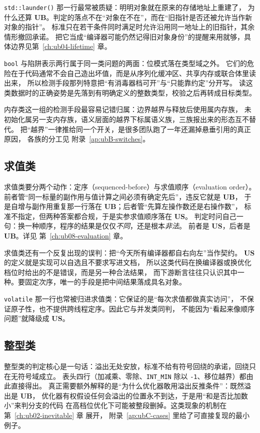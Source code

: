 \documentclass[12pt,a4paper,fontset=fandol]{ctexbook}
\newcommand{\Fn}[1]{\texttt{#1()}}
\newcommand{\Tp}[1]{\texttt{#1}}
\newcommand{\UB}{\textbf{\textsf{UB}}}
\newcommand{\USB}{\textbf{\textsf{US}}}
\begin{document}
\Fn{std::launder} 那一行最常被质疑：明明对象就在原来的存储地址上重建了，
为什么还算 \UB{}。判定的落点不在“对象在不在”，而在“旧指针是否还被允许当作新对象的指针”。
标准只在若干条件同时满足时允许沿用同一地址上的旧指针，其余情形撤回承诺。
把它当成“编译器可能仍然记得旧对象身份”的提醒来用就够，具体边界见第~\ref{ch:ub04-lifetime} 章。

\Tp{bool} 与陷阱表示两行属于同一类问题的两面：位模式落在类型域之外。
它们的危险在于代码通常不会自己造出坏值，而是从序列化缓冲区、共享内存或联合体里读出来，
所以检测手段那列特意把“有消毒器档可开”与“只能靠约定”分开写。
读这类数据时的正确姿势是先落到有明确定义的整数类型，校验之后再转成目标类型。

内存类这一组的检测手段最容易记错归属：边界越界与释放后使用属内存族，
未初始化属另一支内存族，语义层面的越界下标属语义族，三族报出来的形态互不替代。
把“越界”一律推给同一个开关，是很多团队跑了一年还漏掉悬垂引用的真正原因，
各族的分工见 附录~\ref{ap:ubB-switches}。

\subsection{求值类}

求值类要分两个动作：定序（sequenced-before）与求值顺序（evaluation order）。
前者管“同一标量的副作用与值计算之间必须有确定先后”，违反它就是 \UB{}，
于是自增与副作用重复那一行落在 \UB{}；后者管“先算左操作数还是右操作数”，
标准不指定，但两种答案都合规，于是实参求值顺序落在 \USB{}。
判定时问自己一句：换一种顺序，程序的结果是仅仅\emph{不同}，还是根本\emph{非法}。
前者是 \USB{}，后者是 \UB{}。详见 第~\ref{ch:ub08-evaluation} 章。

求值类还有一个反复出现的误判：把“今天所有编译器都自右向左”当作契约。
\USB{} 的定义就是实现可以自选且不要求写进文档，
所以这类代码在换编译器或换优化档位时给出的不是错误，而是另一种合法结果，
而下游断言往往只认识其中一种。要固定次序，唯一的手段是把中间结果落成具名对象。

\Tp{volatile} 那一行也常被归进求值类：它保证的是“每次求值都做真实访问”，
不保证原子性，也不提供跨线程定序。因此它与并发类同判，
不能因为“看起来像顺序问题”就降级成 \USB{}。

\subsection{整型类}

整型类的判定核心是一句话：溢出无处安放，标准不给有符号回绕的承诺，回绕只在无符号域成立。
表头四行（加减乘、零除、\Tp{INT\_MIN} 除以 \Tp{-1}、移位越界）都由此直接得出。
真正需要额外解释的是“为什么优化器敢用溢出反推条件”：既然溢出是 \UB{}，
优化器有权假设任何会溢出的位置永不到达，于是用“和是否比加数小”来判分支的代码
在高档位优化下可能被整段删掉。这类现象的机制在 第~\ref{ch:ub02-inevitable} 章 展开，
附录~\ref{ap:ubC-cases} 里给了可直接复现的最小例子。
\end{document}
